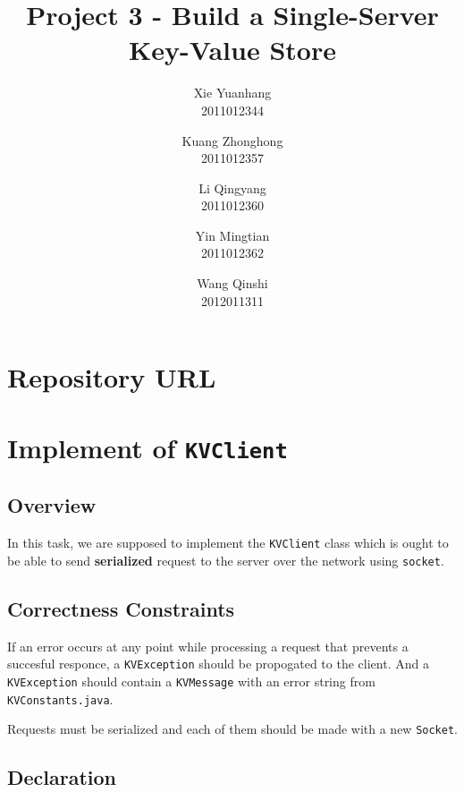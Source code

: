\documentclass{article}
\title{Project 3 - Build a Single-Server Key-Value Store}
\author{
Xie Yuanhang  \\   2011012344\and
Kuang Zhonghong  \\   2011012357\and
Li Qingyang   \\   2011012360 \and
Yin Mingtian   \\   2011012362\and
Wang Qinshi   \\   2012011311}
\date{}
\begin{document}
\maketitle

\setcounter{section}{-1}
\section{Repository URL}

\section{Implement of \texttt{KVClient}}
\subsection{Overview}
In this task, we are supposed to implement the \texttt{KVClient} class which is ought to be able to send \textbf{serialized} request to the server
over the network using \texttt{socket}.
\subsection{Correctness Constraints}
\begin{compactitem}
\item If an error occurs at any point while processing a request that prevents a succesful responce, a \texttt{KVException} should be propogated 
	to the client. And a \texttt{KVException} should contain a \texttt{KVMessage} with an error string from \texttt{KVConstants.java}.
\item Requests must be serialized and each of them should be made with a new \texttt{Socket}.
\end{compactitem}
\subsection{Declaration}
\end{document}
